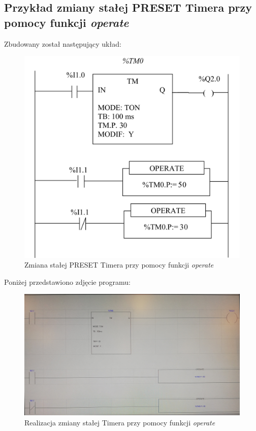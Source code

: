 \documentclass[12pt]{article}
\begin{document}
\subsection{Przykład zmiany stałej PRESET Timera przy pomocy funkcji \textit{operate}}

Zbudowany został następujący układ:

\begin{figure}[H]
    \centering
    \includegraphics[scale=0.25]{operate.png}
    \caption{Zmiana stałej PRESET Timera przy pomocy funkcji \textit{operate}}
\end{figure}

Poniżej przedstawiono zdjęcie programu:

\begin{figure}[H]
    \centering
    \includegraphics[width=\textwidth]{operate_zdj.jpg}
    \caption{Realizacja zmiany stałej Timera przy pomocy funkcji \textit{operate}}
\end{figure}
\end{document}
